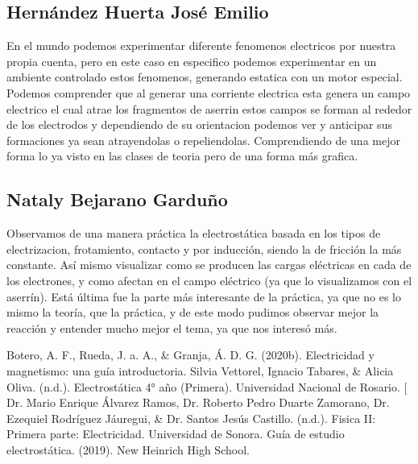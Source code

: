 \documentclass[10pt]{article}
\begin{document}
\begin{multicols}{2}
	\subsection{Hernández Huerta José Emilio}
	En el mundo podemos experimentar diferente fenomenos electricos por nuestra propia cuenta, pero en este caso en especifico podemos experimentar en un ambiente controlado estos fenomenos, generando estatica con un motor especial.
	Podemos comprender que al generar una corriente electrica esta genera un campo electrico el cual atrae los fragmentos de aserrin estos campos se forman al rededor de los electrodos y dependiendo de su orientacion podemos ver y anticipar sus formaciones ya sean atrayendolas o repeliendolas. Comprendiendo de una mejor forma lo ya visto en las clases de teoria pero de una forma más grafica.

	\subsection{Nataly Bejarano Garduño}
	Observamos de una manera práctica la electrostática basada en los tipos de electrizacion, frotamiento, contacto y por inducción, siendo la de fricción la más constante.
	Así mismo visualizar como se producen las cargas eléctricas en cada de los electrones, y como afectan en el campo eléctrico (ya que lo visualizamos con el aserrín).
	Está última fue la parte más interesante de la práctica, ya que no es lo mismo la teoría, que la práctica, y de este modo pudimos observar mejor la reacción y entender mucho mejor el tema, ya que nos interesó más.
\end{multicols}

\begin{thebibliography}{0}
	Botero, A. F., Rueda, J. a. A., \& Granja, Á. D. G. (2020b). Electricidad y magnetismo: una guía introductoria.
	Silvia Vettorel, Ignacio Tabares, \& Alicia Oliva. (n.d.). Electrostática 4° año (Primera). Universidad Nacional de Rosario.
	[ Dr. Mario Enrique Álvarez Ramos, Dr. Roberto Pedro Duarte Zamorano, Dr. Ezequiel Rodríguez Jáuregui, \& Dr. Santos Jesús Castillo. (n.d.). Fisica II: Primera parte: Electricidad. Universidad de Sonora.
	Guía de estudio electrostática. (2019). New Heinrich High School.
\end{thebibliography}
\end{document}
